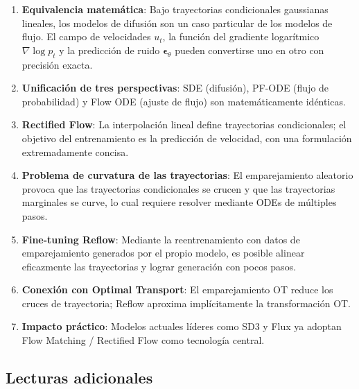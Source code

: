 \documentclass[a4paper]{article}
\begin{document}
\begin{enumerate}
    \item \textbf{Equivalencia matemática}: Bajo trayectorias condicionales gaussianas lineales, los modelos de difusión son un caso particular de los modelos de flujo. El campo de velocidades $u_t$, la función del gradiente logarítmico $\nabla \log p_t$ y la predicción de ruido $\boldsymbol{\epsilon}_\theta$ pueden convertirse uno en otro con precisión exacta.

    \item \textbf{Unificación de tres perspectivas}: SDE (difusión), PF-ODE (flujo de probabilidad) y Flow ODE (ajuste de flujo) son matemáticamente idénticas.

    \item \textbf{Rectified Flow}: La interpolación lineal define trayectorias condicionales; el objetivo del entrenamiento es la predicción de velocidad, con una formulación extremadamente concisa.

    \item \textbf{Problema de curvatura de las trayectorias}: El emparejamiento aleatorio provoca que las trayectorias condicionales se crucen y que las trayectorias marginales se curve, lo cual requiere resolver mediante ODEs de múltiples pasos.

    \item \textbf{Fine-tuning Reflow}: Mediante la reentrenamiento con datos de emparejamiento generados por el propio modelo, es posible alinear eficazmente las trayectorias y lograr generación con pocos pasos.

    \item \textbf{Conexión con Optimal Transport}: El emparejamiento OT reduce los cruces de trayectoria; Reflow aproxima implícitamente la transformación OT.

    \item \textbf{Impacto práctico}: Modelos actuales líderes como SD3 y Flux ya adoptan Flow Matching / Rectified Flow como tecnología central.
\end{enumerate}

\subsection{Lecturas adicionales}
\end{document}

